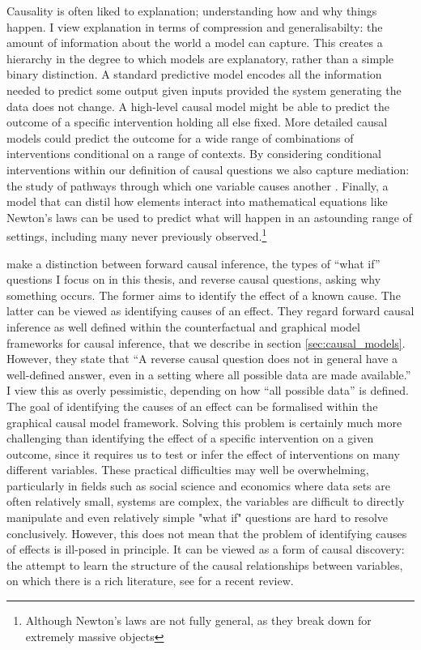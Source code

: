 \documentclass[11pt,a4paper,twoside]{report}
\newcommand{\quotes}[1]{``#1''}
\theoremstyle{plain}
\theoremstyle{definition}
\begin{document}
Causality is often liked to explanation; understanding how and why things happen. I view explanation in terms of compression and generalisabilty: the amount of information about the world a model can capture. This creates a hierarchy in the degree to which models are explanatory, rather than a simple binary distinction. A standard predictive model encodes all the information needed to predict some output given inputs provided the system generating the data does not change. A high-level causal model might be able to predict the outcome of a specific intervention holding all else fixed. More detailed causal models could predict the outcome for a wide range of combinations of interventions conditional on a range of contexts. By considering conditional interventions within our definition of causal questions we also capture mediation: the study of pathways through which one variable causes another \cite{vanderweele2015explanation}. Finally, a model that can distil how elements interact into mathematical equations like Newton's laws can be used to predict what will happen in an astounding range of settings, including many never previously observed.\footnote{Although Newton's laws are not fully general, as they break down for extremely massive objects}

\citet{Gelman2010,gelman2013ask} make a distinction between forward causal inference, the types of \quotes{what if} questions I focus on in this thesis, and reverse causal questions, asking why something occurs. The former aims to identify the effect of a known cause. The latter can be viewed as identifying causes of an effect. They regard forward causal inference as well defined within the counterfactual and graphical model frameworks for causal inference, that we describe in section \ref{sec:causal_models}. However, they state that \quotes{A reverse causal question does not in general have a well-defined answer, even in a setting where all possible data are made available.} I view this as overly pessimistic, depending on how \quotes{all possible data} is defined. The goal of identifying the causes of an effect can be formalised within the graphical causal model framework. Solving this problem is certainly much more challenging than identifying the effect of a specific intervention on a given outcome, since it requires us to test or infer the effect of interventions on many different variables. These practical difficulties may well be overwhelming, particularly in fields such as social science and economics where data sets are often relatively small, systems are complex, the variables are difficult to directly manipulate and even relatively simple "what if" questions are hard to resolve conclusively. However, this does not mean that the problem of identifying causes of effects is ill-posed in principle. It can be viewed as a form of causal discovery: the attempt to learn the structure of the causal relationships between variables, on which there is a rich literature, see \citet{Spirtes2016} for a recent review.
\end{document}
